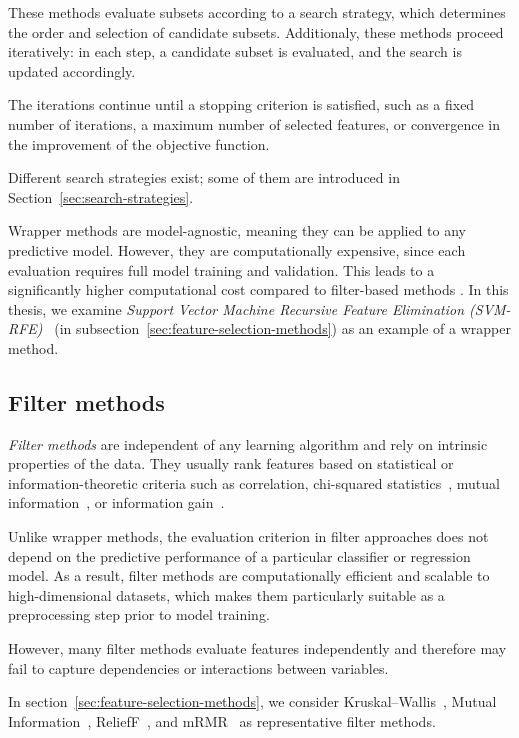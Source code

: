 These methods evaluate subsets according to a search strategy, which determines the order and selection of candidate subsets. Additionaly, these methods proceed iteratively: in each step, a candidate subset is evaluated, and the search is updated accordingly. 

The iterations continue until a stopping criterion is satisfied, such as a fixed number of iterations, a maximum number of selected features, or convergence in the improvement of the objective function.

Different search strategies exist; some of them are introduced in Section~\ref{sec:search-strategies}.

Wrapper methods are model-agnostic, meaning they can be applied to any predictive model. However, they are computationally expensive, since each evaluation requires full model training and validation. This leads to a significantly higher computational cost compared to filter-based methods \cite{guyon2006}. In this thesis, we examine \emph{Support Vector Machine Recursive Feature Elimination (SVM-RFE)}~\cite{guyon2002} (in subsection~\ref{sec:feature-selection-methods}) as an example of a wrapper method. 

\subsection{Filter methods}
\emph{Filter methods} are independent of any learning algorithm and rely on intrinsic properties of the data. They usually rank features based on statistical or information-theoretic criteria such as correlation, chi-squared statistics~\cite{pearson1900}, mutual information~\cite{cover2006}, or information gain~\cite{quinlan1986}. 

Unlike wrapper methods, the evaluation criterion in filter approaches does not depend on the predictive performance of a particular classifier or regression model. \break As a result, filter methods are computationally efficient and scalable to high-dimensional datasets, which makes them particularly suitable as a preprocessing step prior to model training.

However, many filter methods evaluate features independently and therefore may fail to capture dependencies or interactions between variables.

In section~\ref{sec:feature-selection-methods}, we consider Kruskal--Wallis~\cite{kruskal1952}, Mutual Information~\cite{cover2006}, ReliefF~\cite{kononenko1994relieff}, and mRMR~\cite{peng2005} as representative filter methods.

